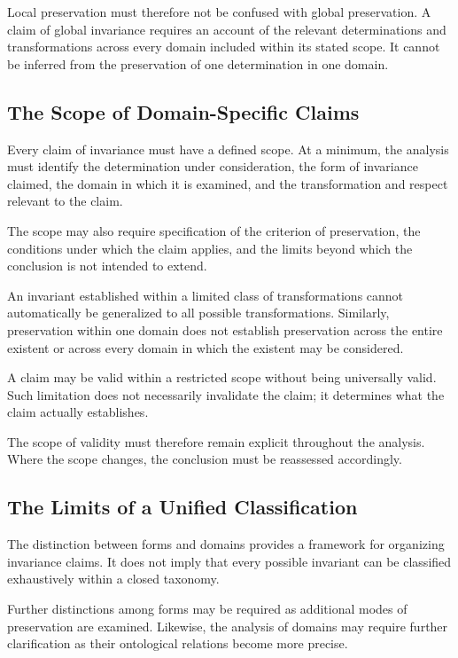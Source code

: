 Local preservation must therefore not
be confused with global preservation.
A claim of global invariance requires
an account of the relevant determinations
and transformations across every domain
included within its stated scope. It
cannot be inferred from the preservation
of one determination in one domain.

\subsection{The Scope of Domain-Specific Claims}

Every claim of invariance must have a
defined scope. At a minimum, the analysis
must identify the determination under
consideration, the form of invariance
claimed, the domain in which it is examined,
and the transformation and respect relevant
to the claim.

The scope may also require specification
of the criterion of preservation, the
conditions under which the claim applies,
and the limits beyond which the conclusion
is not intended to extend.

An invariant established within a limited
class of transformations cannot automatically
be generalized to all possible transformations.
Similarly, preservation within one domain
does not establish preservation across
the entire existent or across every domain
in which the existent may be considered.

A claim may be valid within a restricted
scope without being universally valid.
Such limitation does not necessarily
invalidate the claim; it determines
what the claim actually establishes.

The scope of validity must therefore
remain explicit throughout the analysis.
Where the scope changes, the conclusion
must be reassessed accordingly.

\subsection{The Limits of a Unified Classification}

The distinction between forms and domains
provides a framework for organizing
invariance claims. It does not imply
that every possible invariant can be
classified exhaustively within a closed
taxonomy.

Further distinctions among forms may
be required as additional modes of
preservation are examined. Likewise,
the analysis of domains may require
further clarification as their ontological
relations become more precise.

